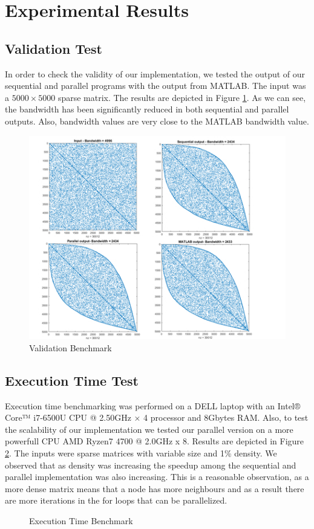 \section{Experimental Results}
\bigbreak
\subsection{Validation Test}
In order to check the validity of our implementation, we tested the output of our sequential and parallel programs with the output from MATLAB. The input was a $5000 \times 5000$ sparse matrix. The results are depicted in Figure \ref{fig:validation}. As we can see, the bandwidth has been significantly reduced in both sequential and parallel outputs. Also, bandwidth values are very close to the MATLAB bandwidth value. 
\begin{figure}[H]
    \centering
    \includegraphics{Webp.net-resizeimage (2).jpg}
    \caption{Validation Benchmark}
    \label{fig:validation}
\end{figure}

\subsection{Execution Time Test}
Execution time benchmarking was performed on a DELL laptop with an Intel® Core™ i7-6500U CPU @ 2.50GHz × 4 processor and 8Gbytes RAM. Also, to test the scalability of our implementation we tested our parallel version on a more powerfull CPU AMD Ryzen7 4700 @ 2.0GHz x 8. Results are depicted in Figure \ref{fig:plot}. The inputs were sparse matrices with variable size and 1\% density. We observed that as density was increasing the speedup among the sequential and parallel implementation was also increasing. This is a reasonable observation, as a more dense matrix means that a node has more neighbours and as a result there are more iterations in the for loops that can be parallelized.
\begin{figure}[H]
    \centering
    
    \caption{Execution Time Benchmark}
    \label{fig:plot}
\end{figure}
